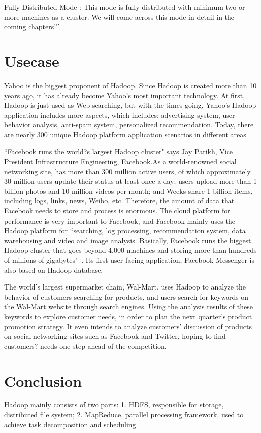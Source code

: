 Fully Distributed Mode : This mode is fully distributed with minimum two or more machines as a cluster. We will come across this mode in detail in the coming chapters'''~\cite{hid-sp18-508-hadoop}. 


\section{Usecase}
Yahoo is the biggest proponent of Hadoop. Since Hadoop is created more than 10 years ago, it has already become Yahoo's most important technology. At first, Hadoop is just used as Web searching, but with the times going, Yahoo's Hadoop application includes more aspects, which includes: advertising system, user behavior analysis, anti-spam system, personalized recommendation. Today, there are nearly 300 unique Hadoop platform application scenarios in different areas ~\cite{hid-sp18-508-yahoo}.

``Facebook runs the world?s largest Hadoop cluster" says Jay Parikh, Vice President Infrastructure Engineering, Facebook.As a world-renowned social networking site, has more than 300 million active users, of which approximately 30 million users update their status at least once a day; users upload more than 1 billion photos and 10 million videos per month; and Weeks share 1 billion items, including logs, links, news, Weibo, etc. Therefore, the amount of data that Facebook needs to store and process is enormous. The cloud platform for performance is very important to Facebook, and Facebook mainly uses the Hadoop platform for ``searching, log processing, recommendation system, data warehousing and video and image analysis. Basically, Facebook runs the biggest Hadoop cluster that goes beyond 4,000 machines and storing more than hundreds of millions of gigabytes"~\cite{hid-sp18-508-fb}. Its first user-facing application, Facebook Messenger is also based on Hadoop database.

The world's largest supermarket chain, Wal-Mart, uses Hadoop to analyze the behavior of customers searching for products, and users search for keywords on the Wal-Mart website through search engines. Using the analysis results of these keywords to explore customer needs, in order to plan the next quarter's product promotion strategy. It even intends to analyze customers' discussion of products on social networking sites such as Facebook and Twitter, hoping to find customers? needs one step ahead of the competition.




\section{Conclusion}
Hadoop mainly consists of two parts: 1. HDFS, responsible for storage, distributed file system; 2. MapReduce, parallel processing framework, used to achieve task decomposition and scheduling. 

